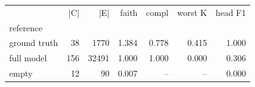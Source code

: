 \begin{tabular}{lrrrrrr}
\toprule
 & |C| & |E| & faith & compl & worst K & head F1 \\
reference &  &  &  &  &  &  \\
\midrule
ground truth & 38 & 1770 & 1.384 & 0.778 & 0.415 & 1.000 \\
full model & 156 & 32491 & 1.000 & 1.000 & 0.000 & 0.306 \\
empty & 12 & 90 & 0.007 & -- & -- & 0.000 \\
\bottomrule
\end{tabular}
